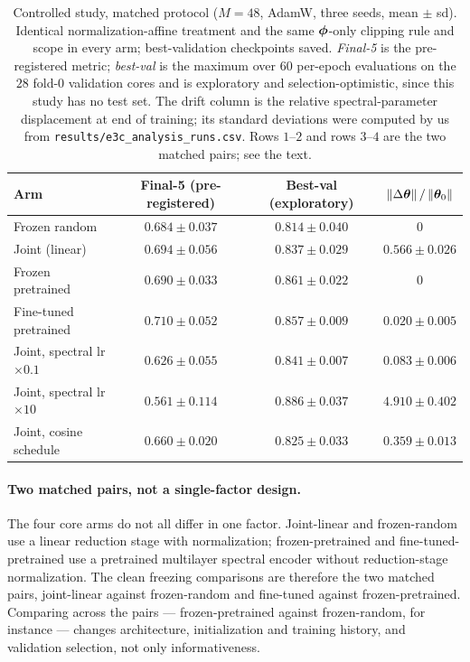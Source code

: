 \begin{table}[htbp]
\centering
\small
\caption{Controlled study, matched protocol ($M = 48$, AdamW, three seeds,
mean $\pm$ sd). Identical normalization-affine treatment and the same
${\boldsymbol{\phi}}$-only clipping rule and scope in every arm; best-validation checkpoints
saved. \emph{Final-5} is the pre-registered metric; \emph{best-val} is the
maximum over $60$ per-epoch evaluations on the $28$ fold-0 validation cores and
is exploratory and selection-optimistic, since this study has no test set. The
drift column is the relative spectral-parameter displacement at end of
training; its standard deviations were computed by us from
\texttt{results/e3c\_analysis\_runs.csv}. Rows $1$--$2$ and rows $3$--$4$ are
the two matched pairs; see the text.}
\label{tab:app_e3c_matched}
\begin{tabular}{lccc}
\toprule
Arm & Final-5 (pre-registered) & Best-val (exploratory) & $\left\lVert\Delta{\boldsymbol{\theta}}\right\rVert/\left\lVert{\boldsymbol{\theta}}_0\right\rVert$ \\
\midrule
Frozen random                   & $0.684 \pm 0.037$ & $0.814 \pm 0.040$ & $0$ \\
Joint (linear)                  & $0.694 \pm 0.056$ & $0.837 \pm 0.029$ & $0.566 \pm 0.026$ \\
Frozen pretrained               & $0.690 \pm 0.033$ & $0.861 \pm 0.022$ & $0$ \\
Fine-tuned pretrained           & $0.710 \pm 0.052$ & $0.857 \pm 0.009$ & $0.020 \pm 0.005$ \\
Joint, spectral lr $\times 0.1$ & $0.626 \pm 0.055$ & $0.841 \pm 0.007$ & $0.083 \pm 0.006$ \\
Joint, spectral lr $\times 10$  & $0.561 \pm 0.114$ & $0.886 \pm 0.037$ & $4.910 \pm 0.402$ \\
Joint, cosine schedule          & $0.660 \pm 0.020$ & $0.825 \pm 0.033$ & $0.359 \pm 0.013$ \\
\bottomrule
\end{tabular}
\end{table}

\paragraph{Two matched pairs, not a single-factor design.} The four core arms
do not all differ in one factor. Joint-linear and frozen-random use a linear
reduction stage with normalization; frozen-pretrained and fine-tuned-pretrained
use a pretrained multilayer spectral encoder without reduction-stage
normalization. The clean freezing comparisons are therefore the two matched
pairs, joint-linear against frozen-random and fine-tuned against
frozen-pretrained. Comparing across the pairs --- frozen-pretrained against
frozen-random, for instance --- changes architecture, initialization and
training history, and validation selection, not only informativeness.

